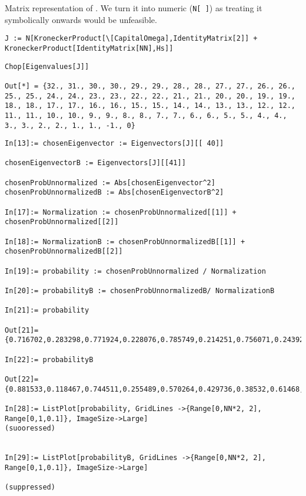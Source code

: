 Matrix representation of \cite[eq. 1]{Lloyd:Time}.
We turn it into numeric (\verb!N[ ]!) as treating  it symbolically onwards would be unfeasible.
\begin{lstlisting}
J := N[KroneckerProduct[\[CapitalOmega],IdentityMatrix[2]] + KroneckerProduct[IdentityMatrix[NN],Hs]]
\end{lstlisting}
\begin{lstlisting}
Chop[Eigenvalues[J]]

Out[*] = {32., 31., 30., 30., 29., 29., 28., 28., 27., 27., 26., 26., 25., 25., 24., 24., 23., 23., 22., 22., 21., 21., 20., 20., 19., 19., 18., 18., 17., 17., 16., 16., 15., 15., 14., 14., 13., 13., 12., 12., 11., 11., 10., 10., 9., 9., 8., 8., 7., 7., 6., 6., 5., 5., 4., 4., 3., 3., 2., 2., 1., 1., -1., 0}
\end{lstlisting}
\begin{lstlisting}
In[13]:= chosenEigenvector := Eigenvectors[J][[ 40]]

chosenEigenvectorB := Eigenvectors[J][[41]]

chosenProbUnnormalized := Abs[chosenEigenvector^2]
chosenProbUnnormalizedB := Abs[chosenEigenvectorB^2]

In[17]:= Normalization := chosenProbUnnormalized[[1]] + chosenProbUnnormalized[[2]]

In[18]:= NormalizationB := chosenProbUnnormalizedB[[1]] + chosenProbUnnormalizedB[[2]]

In[19]:= probability := chosenProbUnnormalized / Normalization

In[20]:= probabilityB := chosenProbUnnormalizedB/ NormalizationB

In[21]:= probability

Out[21]= {0.716702,0.283298,0.771924,0.228076,0.785749,0.214251,0.756071,0.243929,0.687408,0.312592,0.590214,0.409786,0.479286,0.520714,0.371512,0.628488,0.283298,0.716702,0.228076,0.771924,0.214251,0.785749,0.243929,0.756071,0.312592,0.687408,0.409786,0.590214,0.520714,0.479286,0.628488,0.371512,0.716702,0.283298,0.771924,0.228076,0.785749,0.214251,0.756071,0.243929,0.687408,0.312592,0.590214,0.409786,0.479286,0.520714,0.371512,0.628488,0.283298,0.716702,0.228076,0.771924,0.214251,0.785749,0.243929,0.756071,0.312592,0.687408,0.409786,0.590214,0.520714,0.479286,0.628488,0.371512}

In[22]:= probabilityB

Out[22]= {0.881533,0.118467,0.744511,0.255489,0.570264,0.429736,0.38532,0.61468,0.217835,0.782165,0.0933066,0.906693,0.0306941,0.969306,0.0395291,0.960471,0.118467,0.881533,0.255489,0.744511,0.429736,0.570264,0.61468,0.38532,0.782165,0.217835,0.906693,0.0933066,0.969306,0.0306941,0.960471,0.0395291,0.881533,0.118467,0.744511,0.255489,0.570264,0.429736,0.38532,0.61468,0.217835,0.782165,0.0933066,0.906693,0.0306941,0.969306,0.0395291,0.960471,0.118467,0.881533,0.255489,0.744511,0.429736,0.570264,0.61468,0.38532,0.782165,0.217835,0.906693,0.0933066,0.969306,0.0306941,0.960471,0.0395291}

In[28]:= ListPlot[probability, GridLines ->{Range[0,NN*2, 2], Range[0,1,0.1]}, ImageSize->Large]
(suooressed)


In[29]:= ListPlot[probabilityB, GridLines ->{Range[0,NN*2, 2], Range[0,1,0.1]}, ImageSize->Large]

(suppressed)

\end{lstlisting}